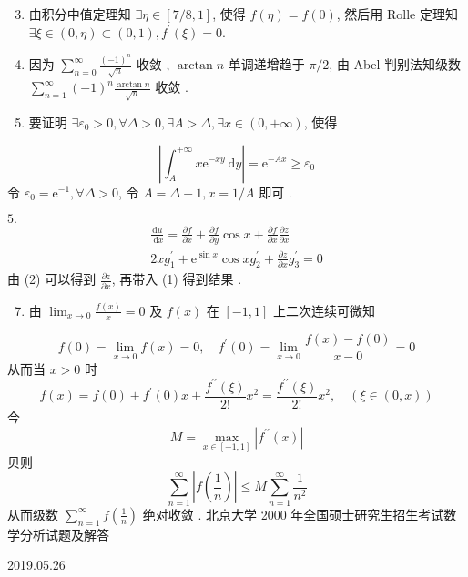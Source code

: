 \documentclass[10pt]{article}
\begin{document}
\begin{enumerate}
  \setcounter{enumi}{2}
  \item  由积分中值定理知  $\exists \eta \in[7 / 8,1]$,  使得  $f(\eta)=f(0)$,  然后用  Rolle  定理知  $\exists \xi \in(0, \eta) \subset(0,1), f^{\prime}(\xi)=0$.

  \item  因为  $\sum_{n=0}^{\infty} \frac{(-1)^{n}}{\sqrt{n}}$  收敛 , $\arctan n$  单调递增趋于  $\pi / 2$,  由  Abel  判别法知级数  $\sum_{n=1}^{\infty}(-1)^{n} \frac{\arctan n}{\sqrt{n}}$  收敛 .

  \item  要证明  $\exists \varepsilon_{0}>0, \forall \Delta>0, \exists A>\Delta, \exists x \in(0,+\infty)$,  使得 

\end{enumerate}
$$
\left|\int_{A}^{+\infty} x \mathrm{e}^{-x y} \mathrm{~d} y\right|=\mathrm{e}^{-A x} \geq \varepsilon_{0}
$$
 令  $\varepsilon_{0}=\mathrm{e}^{-1}, \forall \Delta>0$,  令  $A=\Delta+1, x=1 / A$  即可 .

$5 .$
$$
\begin{gathered}
\frac{\mathrm{d} u}{\mathrm{~d} x}=\frac{\partial f}{\partial x}+\frac{\partial f}{\partial y} \cos x+\frac{\partial f}{\partial x} \frac{\partial z}{\partial x} \\
2 x g_{1}^{\prime}+\mathrm{e}^{\sin x} \cos x g_{2}^{\prime}+\frac{\partial z}{\partial x} g_{3}^{\prime}=0
\end{gathered}
$$
 由 (2) 可以得到  $\frac{\partial z}{\partial x}$,  再带入 (1) 得到结果 .

\begin{enumerate}
  \setcounter{enumi}{6}
  \item  由  $\lim _{x \rightarrow 0} \frac{f(x)}{x}=0$  及  $f(x)$  在  $[-1,1]$  上二次连续可微知 
\end{enumerate}
$$
f(0)=\lim _{x \rightarrow 0} f(x)=0, \quad f^{\prime}(0)=\lim _{x \rightarrow 0} \frac{f(x)-f(0)}{x-0}=0
$$
 从而当  $x>0$  时 
$$
f(x)=f(0)+f^{\prime}(0) x+\frac{f^{\prime \prime}(\xi)}{2 !} x^{2}=\frac{f^{\prime \prime}(\xi)}{2 !} x^{2}, \quad(\xi \in(0, x))
$$
 今 
$$
M=\max _{x \in[-1,1]}\left|f^{\prime \prime}(x)\right|
$$
 贝则 
$$
\sum_{n=1}^{\infty}\left|f\left(\frac{1}{n}\right)\right| \leq M \sum_{n=1}^{\infty} \frac{1}{n^{2}}
$$
 从而级数  $\sum_{n=1}^{\infty} f\left(\frac{1}{n}\right)$  绝对收敛 .  北京大学  2000  年全国硕士研究生招生考试数学分析试题及解答 

   

2019.05.26
\end{document}
